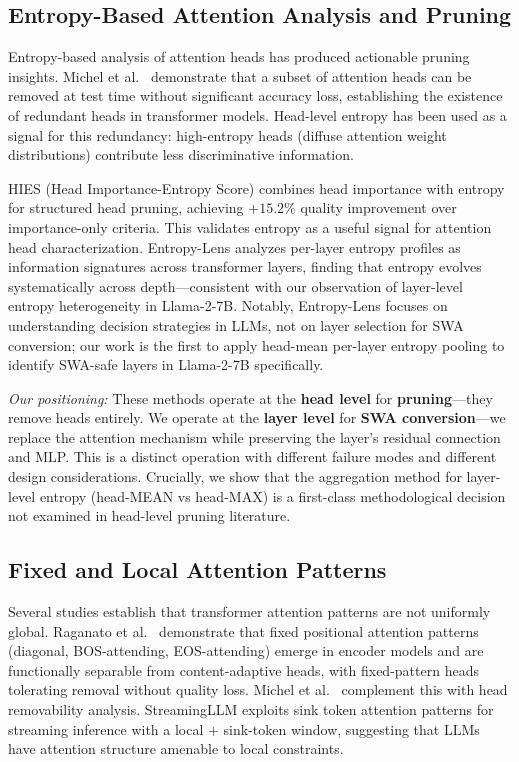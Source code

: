 \subsection{Entropy-Based Attention Analysis and Pruning}

Entropy-based analysis of attention heads has produced actionable pruning insights. Michel et al.\ \cite{Michel2019Sixteen} demonstrate that a subset of attention heads can be removed at test time without significant accuracy loss, establishing the existence of redundant heads in transformer models. Head-level entropy has been used as a signal for this redundancy: high-entropy heads (diffuse attention weight distributions) contribute less discriminative information.

HIES (Head Importance-Entropy Score) \cite{Choi2025Entropy} combines head importance with entropy for structured head pruning, achieving $+15.2\%$ quality improvement over importance-only criteria. This validates entropy as a useful signal for attention head characterization. Entropy-Lens \cite{Ali2025Entropy} analyzes per-layer entropy profiles as information signatures across transformer layers, finding that entropy evolves systematically across depth---consistent with our observation of layer-level entropy heterogeneity in Llama-2-7B. Notably, Entropy-Lens focuses on understanding decision strategies in LLMs, not on layer selection for SWA conversion; our work is the first to apply head-mean per-layer entropy pooling to identify SWA-safe layers in Llama-2-7B specifically.

\textit{Our positioning:} These methods operate at the \textbf{head level} for \textbf{pruning}---they remove heads entirely. We operate at the \textbf{layer level} for \textbf{SWA conversion}---we replace the attention mechanism while preserving the layer's residual connection and MLP. This is a distinct operation with different failure modes and different design considerations. Crucially, we show that the aggregation method for layer-level entropy (head-MEAN vs head-MAX) is a first-class methodological decision not examined in head-level pruning literature.

\subsection{Fixed and Local Attention Patterns}

Several studies establish that transformer attention patterns are not uniformly global. Raganato et al.\ \cite{Raganato2020Fixed} demonstrate that fixed positional attention patterns (diagonal, BOS-attending, EOS-attending) emerge in encoder models and are functionally separable from content-adaptive heads, with fixed-pattern heads tolerating removal without quality loss. Michel et al.\ \cite{Michel2019Sixteen} complement this with head removability analysis. StreamingLLM \cite{Xiao2024StreamingLLM} exploits sink token attention patterns for streaming inference with a local $+$ sink-token window, suggesting that LLMs have attention structure amenable to local constraints.

